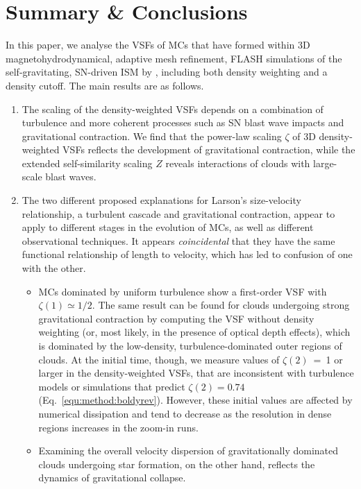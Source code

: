 \section{Summary \& Conclusions}\label{conclusions}

In this paper, we analyse the VSFs of MCs that have formed within 3D magnetohydrodynamical, adaptive mesh refinement, FLASH simulations of the self-gravitating, SN-driven ISM by , including both density weighting and a density cutoff.
The main results are as follows.

\begin{enumerate}
	\item The scaling of the density-weighted VSFs depends on a combination of turbulence and more coherent processes such as SN blast wave impacts and gravitational contraction. We find that the power-law scaling $\zeta$ of 3D density-weighted VSFs reflects the development of gravitational contraction, while the extended self-similarity scaling $Z$ reveals interactions of clouds with large-scale blast waves.
    \item The two different proposed explanations for Larson's size-velocity relationship, a turbulent cascade and gravitational contraction,  appear to apply to different stages in the evolution of MCs, as well as different observational techniques. It appears {\em coincidental} that they have the same functional relationship of length to velocity, which has led to confusion of one with the other.
    \begin{itemize}
        \item MCs dominated by uniform turbulence show a first-order VSF with $\zeta(1) \simeq 1/2$. 
        The same result can be found for clouds undergoing strong gravitational contraction by computing the VSF without density weighting (or, most likely, in the presence of optical depth effects), which is dominated by the low-density, turbulence-dominated outer regions of clouds.
        At the initial time, though, we measure values of $\zeta(2)$~=~1 or larger in the density-weighted VSFs, that are inconsistent with turbulence models or simulations that predict $\zeta(2) = 0.74$ (Eq.~\ref{equ:method:boldyrev}).
        However, these initial values are affected by numerical dissipation and tend to decrease as the resolution in dense regions increases in the zoom-in runs.
        \item Examining the overall velocity dispersion of gravitationally dominated clouds undergoing star formation, on the other hand, reflects the dynamics of gravitational collapse.

\end{itemize}
\end{enumerate}
